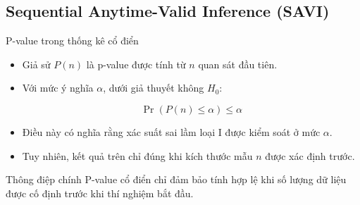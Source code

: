 \subsection{Sequential Anytime-Valid Inference (SAVI)}

\begin{frame}{P-value trong thống kê cổ điển}

\begin{itemize}

\item Giả sử $P(n)$ là p-value được tính từ $n$ quan sát đầu tiên.

\item Với mức ý nghĩa $\alpha$, dưới giả thuyết không $H_0$:

\[
\Pr(P(n)\le \alpha)\le \alpha
\]

\item Điều này có nghĩa rằng xác suất sai lầm loại I được kiểm soát ở mức $\alpha$.

\item Tuy nhiên, kết quả trên chỉ đúng khi kích thước mẫu $n$ được xác định trước.

\end{itemize}

\begin{block}{Thông điệp chính}
P-value cổ điển chỉ đảm bảo tính hợp lệ khi số lượng dữ liệu được cố định trước khi thí nghiệm bắt đầu.
\end{block}

\end{frame}

